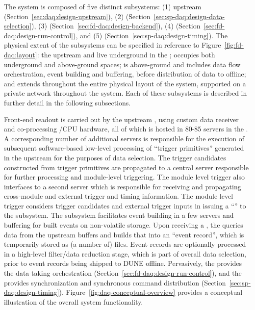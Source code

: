 The   system is composed of five distinct subsystems:
%
(1) upstream  (Section~\ref{sec:daq:design-upstream}),
%
(2)  (Section~\ref{sec:sp-daq:design-data-selection}),
%
(3)  (Section~\ref{sec:fd-daq:design-backend}), 
%
(4)  (Section~\ref{sec:fd-daq:design-run-control}), and
%
(5)  (Section~\ref{sec:sp-daq:design-timing}).
%
The physical extent of the subsystems
can be specified in reference to Figure~\ref{fig:fd-daq:layout}: the
upstream  and   live underground in the ;  occupies
both underground and above-ground spaces;  is above-ground
and includes data flow orchestration, event building and buffering, before distribution of data
to offline; and  extends throughout the entire physical layout of the
system, supported on a private network throughout the  system. Each of these subsystems is described in further
detail in the following subsections. 

Front-end readout is carried out by the upstream , using custom data receiver and
co-processing /CPU hardware, all of which is hosted in 80-85 servers in the . A
corresponding number of additional servers is responsible for the execution
of subsequent software-based low-level processing of ``trigger
primitives''
generated in the upstream  for the purposes of data selection. The trigger candidates constructed from trigger primitives are propagated to a central server responsible
for further processing and module-level triggering. The module level
trigger also
interfaces to a second server which is responsible for receiving and
propagating cross-module and external trigger and timing
information. The module level trigger considers trigger candidates and
external trigger inputs in issuing a ``'' to the 
subsystem. The  subsystem 
facilitates event building in a few servers and buffering for built
events on non-volatile storage. Upon receiving a , the 
 queries
data from the upstream  buffers and builds that into an ``event
record'', which is temporarily stored as (a number of) files. Event records are optionally processed in a high-level
filter/data reduction stage, which is part of overall data selection,
 prior to event records being shipped to DUNE offline. Pervasively,
 the   provides the data taking orchestration
 (Section~\ref{sec:fd-daq:design-run-control}), and the
  provides synchronization and synchronous command distribution
 (Section~\ref{sec:sp-daq:design-timing}). Figure~\ref{fig:daq-conceptual-overview}
 provides a conceptual illustration of the overall  system
 functionality.%

